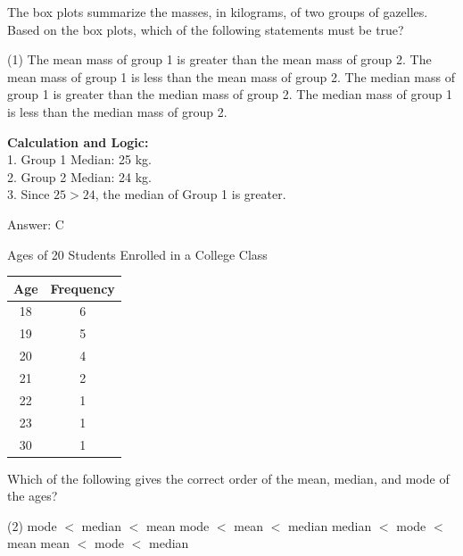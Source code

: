 \documentclass[11pt,paper=a4,answers]{exam}
\begin{document}
\begin{questions}
\vspace{60pt}

\question
The box plots summarize the masses, in kilograms, of two groups of gazelles. Based on the box plots, which of the following statements must be true?
\begin{tasks}(1)
    \task The mean mass of group 1 is greater than the mean mass of group 2.
    \task The mean mass of group 1 is less than the mean mass of group 2.
    \task The median mass of group 1 is greater than the median mass of group 2.
    \task The median mass of group 1 is less than the median mass of group 2.
\end{tasks}

\begin{solution}
\textbf{Calculation and Logic:} \\
1. Group 1 Median: 25 kg. \\
2. Group 2 Median: 24 kg. \\
3. Since $25 > 24$, the median of Group 1 is greater.

\vspace{30pt}

Answer: \colorbox{yellow!100}{C}
\end{solution}

\vspace{60pt}

\question
Ages of 20 Students Enrolled in a College Class
\begin{center}
\begin{tabular}{|c|c|}
\hline
Age & Frequency \\ \hline
18 & 6 \\ \hline
19 & 5 \\ \hline
20 & 4 \\ \hline
21 & 2 \\ \hline
22 & 1 \\ \hline
23 & 1 \\ \hline
30 & 1 \\ \hline
\end{tabular}
\end{center}
Which of the following gives the correct order of the mean, median, and mode of the ages?
\begin{tasks}(2)
    \task mode $<$ median $<$ mean
    \task mode $<$ mean $<$ median
    \task median $<$ mode $<$ mean
    \task mean $<$ mode $<$ median
\end{tasks}


\end{questions}
\end{document}
